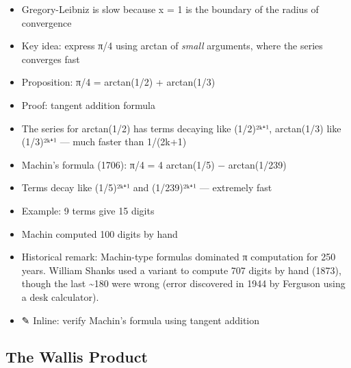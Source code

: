 \documentclass[
  10pt,
  letterpaper,
]{scrbook}
\providecommand{\tightlist}{%
  \setlength{\itemsep}{0pt}\setlength{\parskip}{0pt}}
\begin{document}
\begin{itemize}
\tightlist
\item
  Gregory-Leibniz is slow because x = 1 is the boundary of the radius of
  convergence
\item
  Key idea: express π/4 using arctan of \emph{small} arguments, where
  the series converges fast
\item
  Proposition: π/4 = arctan(1/2) + arctan(1/3)
\item
  Proof: tangent addition formula
\item
  The series for arctan(1/2) has terms decaying like (1/2)²ᵏ⁺¹,
  arctan(1/3) like (1/3)²ᵏ⁺¹ --- much faster than 1/(2k+1)
\item
  Machin's formula (1706): π/4 = 4 arctan(1/5) − arctan(1/239)
\item
  Terms decay like (1/5)²ᵏ⁺¹ and (1/239)²ᵏ⁺¹ --- extremely fast
\item
  Example: 9 terms give 15 digits
\item
  Machin computed 100 digits by hand
\item
  Historical remark: Machin-type formulas dominated π computation for
  250 years. William Shanks used a variant to compute 707 digits by hand
  (1873), though the last \textasciitilde180 were wrong (error
  discovered in 1944 by Ferguson using a desk calculator).
\item
  ✎ Inline: verify Machin's formula using tangent addition
\end{itemize}

\subsection{The Wallis Product}\label{the-wallis-product-1}
\end{document}
